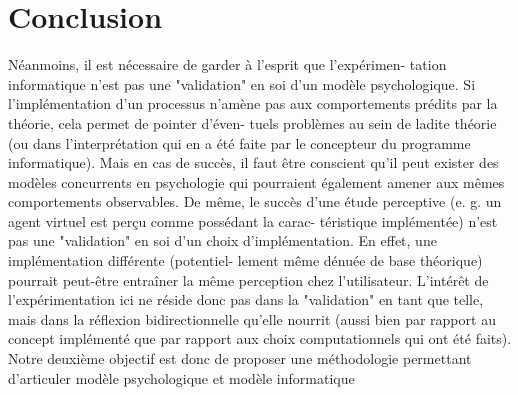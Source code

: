 \chapter{Conclusion}

Néanmoins, il est nécessaire de garder à l’esprit que l’expérimen-
tation informatique n’est pas une "validation" en soi d’un modèle
psychologique. Si l’implémentation d’un processus n’amène pas aux
comportements prédits par la théorie, cela permet de pointer d’éven-
tuels problèmes au sein de ladite théorie (ou dans l’interprétation qui
en a été faite par le concepteur du programme informatique). Mais
en cas de succès, il faut être conscient qu’il peut exister des modèles
concurrents en psychologie qui pourraient également amener aux
mêmes comportements observables. De même, le succès d’une étude
perceptive (e. g. un agent virtuel est perçu comme possédant la carac-
téristique implémentée) n’est pas une "validation" en soi d’un choix
d’implémentation. En effet, une implémentation différente (potentiel-
lement même dénuée de base théorique) pourrait peut-être entraîner
la même perception chez l’utilisateur. L’intérêt de l’expérimentation
ici ne réside donc pas dans la "validation" en tant que telle, mais dans
la réflexion bidirectionnelle qu’elle nourrit (aussi bien par rapport au
concept implémenté que par rapport aux choix computationnels qui
ont été faits).
Notre deuxième objectif est donc de proposer une méthodologie
permettant d’articuler modèle psychologique et modèle informatique